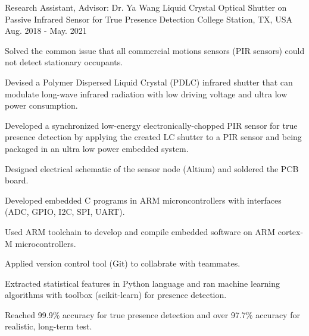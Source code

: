 

\begin{cventries}

  \cventry
    {Research Assistant, Advisor: Dr. Ya Wang} %
    {Liquid Crystal Optical Shutter on Passive Infrared Sensor for True Presence Detection} %
    {College Station, TX, USA} %
    {Aug. 2018 - May. 2021} %
    {
      \begin{cvitems} %
        \item Solved the common issue that all commercial motions sensors (PIR sensors) could not detect stationary occupants.
        \item Devised a Polymer Dispersed Liquid Crystal (PDLC) infrared shutter that can modulate long-wave infrared radiation with low driving voltage and ultra low power consumption.
        \item Developed a synchronized low-energy electronically-chopped PIR sensor for true presence detection by applying the created LC shutter to a PIR sensor and being packaged in an ultra low power embedded system.
        \item Designed electrical schematic of the sensor node (Altium) and soldered the PCB board.
        \item Developed embedded C programs in ARM microncontrollers with interfaces (ADC, GPIO, I2C, SPI, UART).
        \item Used ARM toolchain to develop and compile embedded software on ARM cortex-M microcontrollers.
        \item Applied version control tool (Git) to collabrate with teammates.
        \item Extracted statistical features in Python language and ran machine learning algorithms with toolbox (scikit-learn) for presence detection.
        \item Reached 99.9\% accuracy for true presence detection and over 97.7\% accuracy for realistic, long-term test. 
      \end{cvitems}
    }
    

\end{cventries}
